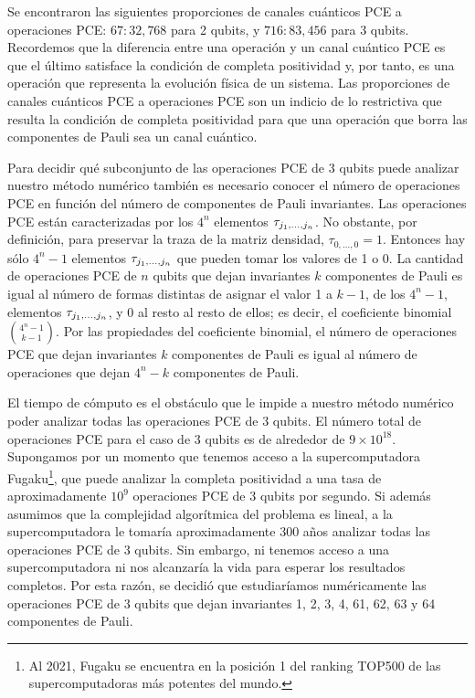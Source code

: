 Se encontraron las siguientes proporciones de canales cuánticos PCE a 
operaciones PCE: $67:32,768$ para 2 qubits, y $716:83,456$ para 
3 qubits. Recordemos que la diferencia entre una operación y un canal cuántico PCE
es que el último satisface la condición de completa positividad y, por tanto, 
es una operación que representa la evolución física de un sistema. 
Las proporciones de canales cuánticos PCE a operaciones PCE son un indicio 
de lo restrictiva que resulta la condición de completa positividad para que 
una operación que borra las componentes de Pauli sea un canal cuántico.

Para decidir qué subconjunto de las operaciones PCE de 3 qubits puede analizar
nuestro método numérico también es necesario conocer el número 
de operaciones PCE en función del número de componentes 
de Pauli invariantes. Las operaciones PCE están caracterizadas 
por los $4^n$ elementos $\tau_{j_1,\ldots ,j_n}$. No obstante, por definición, 
para preservar la traza de la matriz densidad, $\tau_{0,\ldots,0}=1$.
Entonces hay sólo $4^n-1$ elementos $\tau_{j_1,\ldots ,j_n}$ que pueden tomar los valores de 1 o 0.
La cantidad de operaciones PCE de $n$ qubits que dejan invariantes $k$ componentes 
de Pauli es igual al número de formas distintas de asignar el valor 1
a $k-1$, de los $4^n-1$, elementos $\tau_{j_1,\ldots ,j_n}$, y 0 al resto al resto de ellos; 
es decir, el coeficiente binomial $\binom{4^n-1}{k-1}$. Por las propiedades
del coeficiente binomial, el número de operaciones PCE que dejan invariantes 
$k$ componentes de Pauli es igual al número de operaciones que dejan $4^n-k$
componentes de Pauli. 

El tiempo de cómputo es el obstáculo que le impide a nuestro método numérico
poder analizar todas las operaciones PCE de 3 qubits. 
El número total de operaciones PCE para el caso 
de 3 qubits es de alrededor de $9\times10^{18}$. Supongamos por un momento
que tenemos acceso a la supercomputadora Fugaku\footnote{Al 2021, 
Fugaku se encuentra en la posición 1 del ranking TOP500 de las supercomputadoras
más potentes del mundo.},
que puede analizar la completa positividad a una tasa de
aproximadamente $10^9$ operaciones PCE de 
3 qubits por segundo. Si además asumimos que la complejidad 
algorítmica del problema es lineal, a la supercomputadora le tomaría
aproximadamente 300 años analizar todas las operaciones PCE de 3 qubits.
Sin embargo, ni tenemos acceso a una supercomputadora
ni nos alcanzaría la vida para esperar los resultados completos. 
Por esta razón, se decidió que estudiaríamos numéricamente 
las operaciones PCE de 3 qubits que dejan invariantes 1, 2, 3, 4, 61, 62, 63 y 64
componentes de Pauli.


